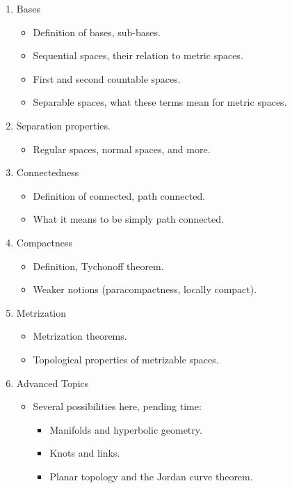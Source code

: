 \documentclass{article}
\begin{document}
\begin{enumerate}
\begin{itemize}
            \end{itemize}
        \item Bases
            \begin{itemize}
                \item Definition of bases, sub-bases.
                \item Sequential spaces, their relation to metric spaces.
                \item First and second countable spaces.
                \item Separable spaces, what these terms mean for metric spaces.
            \end{itemize}
        \item Separation properties.
            \begin{itemize}
                \item Regular spaces, normal spaces, and more.
            \end{itemize}
        \item Connectedness
            \begin{itemize}
                \item Definition of connected, path connected.
                \item What it means to be simply path connected.
            \end{itemize}
        \item Compactness
            \begin{itemize}
                \item Definition, Tychonoff theorem.
                \item Weaker notions (paracompactness, locally compact).
            \end{itemize}
        \item Metrization
            \begin{itemize}
                \item Metrization theorems.
                \item Topological properties of metrizable spaces.
            \end{itemize}
        \item Advanced Topics
            \begin{itemize}
                \item Several possibilities here, pending time:
                \begin{itemize}
                    \item Manifolds and hyperbolic geometry.
                    \item Knots and links.
                    \item Planar topology and the Jordan curve theorem.
                \end{itemize}
            \end{itemize}
    \end{enumerate}
\end{document}
